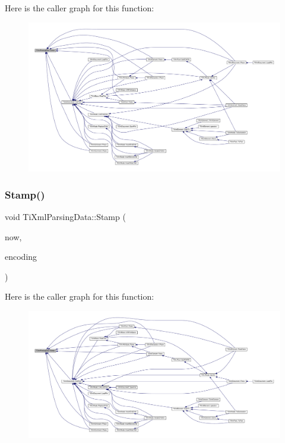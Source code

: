 Here is the caller graph for this function\+:\nopagebreak
\begin{figure}[H]
\begin{center}
\leavevmode
\includegraphics[width=350pt]{class_ti_xml_parsing_data_a02ba4903fd3b70b43524ad60a4eece7c_icgraph}
\end{center}
\end{figure}
\mbox{\label{class_ti_xml_parsing_data_a65cee8ab77a36c605db08c84b4c30a7d}} 
\subsubsection{\texorpdfstring{Stamp()}{Stamp()}}
{\footnotesize\ttfamily void Ti\+Xml\+Parsing\+Data\+::\+Stamp (\begin{DoxyParamCaption}\item[{const char $\ast$}]{now,  }\item[{\hyperlink{tinyxml_8h_a88d51847a13ee0f4b4d320d03d2c4d96}{Ti\+Xml\+Encoding}}]{encoding }\end{DoxyParamCaption})}

Here is the caller graph for this function\+:\nopagebreak
\begin{figure}[H]
\begin{center}
\leavevmode
\includegraphics[width=350pt]{class_ti_xml_parsing_data_a65cee8ab77a36c605db08c84b4c30a7d_icgraph}
\end{center}
\end{figure}


